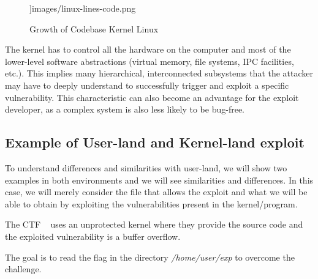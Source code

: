 \documentclass{masterthesis}
\newcommand{\vtnote}[1]{\todo[color=green!20]{#1}}
\begin{document}
\begin{itemize}
\begin{figure}[h!]
{  \textwidth]{images/linux-lines-code.png}}
   \caption{Growth of Codebase Kernel Linux}
   \label{line_code_graphview}
\end{figure} 
The kernel has to control all the hardware on the computer and most of the lower-level software
abstractions (virtual memory, file systems, IPC facilities, etc.). This implies many hierarchical, interconnected subsystems that the attacker may have to deeply understand to successfully trigger and exploit a specific
vulnerability. This characteristic can also become an advantage for the exploit developer, as a complex system is also less likely to be bug-free.
\end{itemize}
\subsection{Example of User-land and Kernel-land exploit}
\label{subsect:example_of_kernel_user_land}
\vtnote{da verificare}

To understand differences and similarities with user-land, we will show two examples in both environments and we will see similarities and differences. In this case, we will merely consider the file that allows the exploit and what we will be able to obtain by exploiting the vulnerabilities present in the kernel/program.

The CTF ~\cite{m0leconTeaser2020_babyk} uses an unprotected kernel where they provide the source code and the exploited vulnerability is a buffer overflow.

The goal is to read the flag in the directory \textit{/home/user/exp} to overcome the challenge.
\end{document}
